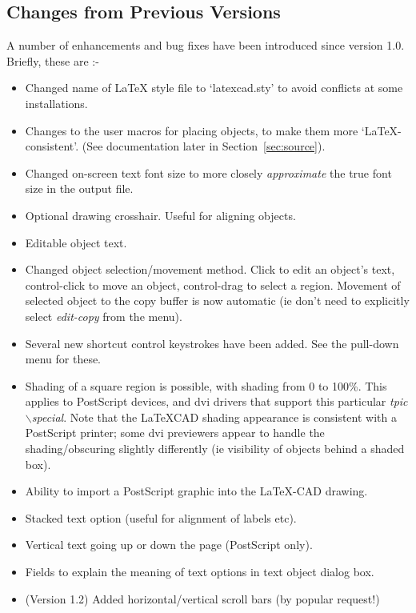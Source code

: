 \documentclass[a4paper]{article}
\newcommand{\bs}{$\backslash$}
\begin{document}
\subsection{Changes from Previous Versions}
A number of enhancements and bug fixes have been introduced
since version 1.0. Briefly, these are :-
\begin{itemize}
    \item Changed name of \LaTeX\/ style file to `latexcad.sty' to
        avoid conflicts at some installations.
    \item Changes to the user macros for placing objects, to make them
        more `\LaTeX-consistent'. (See documentation later
        in Section~\ref{sec:source}).
    \item Changed on-screen text font size to more closely
        \textit{approximate} the true font size in the output file.
    \item Optional drawing crosshair. Useful for aligning objects.
    \item Editable object text.
    \item Changed object selection/movement method.  Click to
        edit an object's text, control-click to move an object,
        control-drag to select a region. Movement of selected
        object to the copy buffer is now automatic (ie don't
        need to explicitly select \textit{edit-copy} from the menu).
    \item Several new shortcut control keystrokes have been added.
        See the pull-down menu for these.
    \item Shading of a square region is possible, with shading from
        0 to 100\%. This applies to PostScript devices, and \textsf{dvi}
        drivers that support this particular \textit{tpic \bs special}.
        Note that the LaTeXCAD shading appearance is consistent
        with a PostScript printer; some \textsf{dvi} previewers appear to
        handle the shading/obscuring slightly differently
        (ie visibility of objects behind a shaded box).
    \item Ability to import a PostScript graphic into the LaTeX-CAD drawing.
    \item Stacked text option (useful for alignment of labels etc).
    \item Vertical text going up or down the page (PostScript only).
    \item Fields to explain the meaning of text options in text
        object dialog box.
    \item (Version 1.2) Added horizontal/vertical scroll bars (by popular request!)

\end{itemize}
\end{document}
